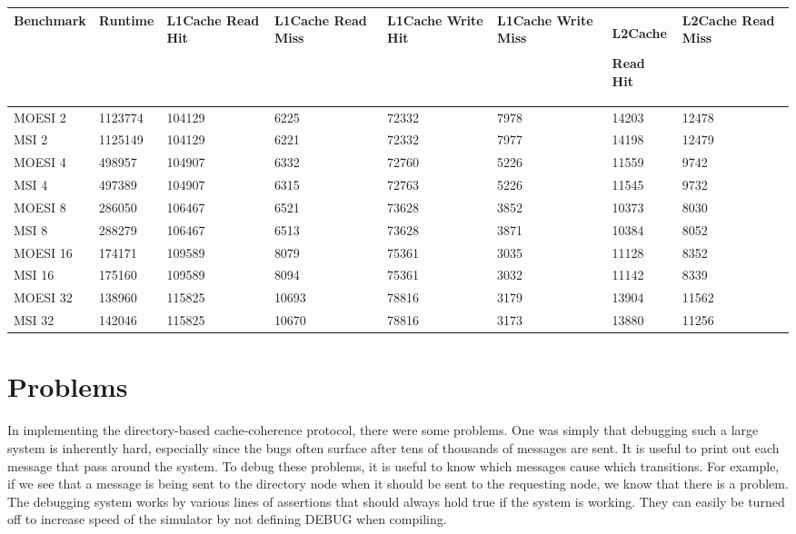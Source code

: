 \documentclass[letterpaper]{article}
\begin{document}
\begin{center}
\tablehead{}
\begin{supertabular}{|m{0.7330598in}|m{0.7337598in}|m{0.7337598in}|m{0.7337598in}|m{0.7337598in}|m{0.7337598in}|m{0.7337598in}|m{0.7351598in}|}
\hline
Benchmark &
Runtime &
L1Cache\newline
Read Hit &
L1Cache\newline
Read Miss &
L1Cache\newline
Write Hit &
L1Cache\newline
Write Miss &
L2Cache

Read Hit &
L2Cache\newline
Read Miss\\\hline
MOESI 2 &
1123774 &
104129 &
6225 &
72332 &
7978 &
14203 &
12478\\\hline
MSI 2 &
1125149 &
104129 &
6221 &
72332 &
7977 &
14198 &
12479\\\hline
MOESI 4 &
498957 &
104907 &
6332 &
72760 &
5226 &
11559 &
9742\\\hline
MSI 4 &
497389 &
104907 &
6315 &
72763 &
5226 &
11545 &
9732\\\hline
MOESI 8 &
286050 &
106467 &
6521 &
73628 &
3852 &
10373 &
8030\\\hline
MSI 8 &
288279 &
106467 &
6513 &
73628 &
3871 &
10384 &
8052\\\hline
MOESI 16 &
174171 &
109589 &
8079 &
75361 &
3035 &
11128 &
8352\\\hline
MSI 16 &
175160 &
109589 &
8094 &
75361 &
3032 &
11142 &
8339\\\hline
MOESI 32 &
138960 &
115825 &
10693 &
78816 &
3179 &
13904 &
11562\\\hline
MSI 32 &
142046 &
115825 &
10670 &
78816 &
3173 &
13880 &
11256\\\hline
\end{supertabular}
\end{center}
\section[Problems]{\rmfamily Problems}
In implementing the directory-based cache-coherence protocol, there were some problems. One was simply that debugging such a large system is inherently hard, especially since the bugs often surface after tens of thousands of messages are sent. It is useful to print out each message that pass around the system. To debug these problems, it is useful to know which messages cause which transitions. For example, if we see that a message is being sent to the directory node when it should be sent to the requesting node, we know that there is a problem. The debugging system works by various lines of assertions that should always hold true if the system is working. They can easily be turned off to increase speed of the simulator by not defining DEBUG when compiling.
\end{document}
